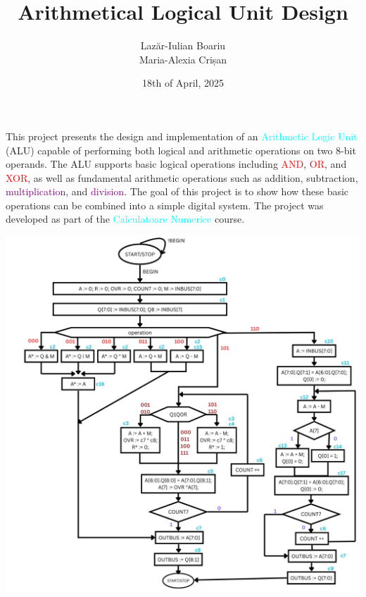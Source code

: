 \documentclass[12pt, letterpaper]{article}
\title{\color{BlueGreen}\textbf{Arithmetical Logical Unit Design}}
\author{
\textcolor{OliveGreen}{Laz\u{a}r-Iulian Boariu} \\
\textcolor{OliveGreen}{Maria-Alexia Crișan}
                                        }
\date{18th of April, 2025}
\begin{document}
\maketitle

\newpage

\tableofcontents

\newpage


This project presents the design and implementation of an \textcolor{cyan}{Arithmetic Logic Unit} (ALU)
capable of performing both logical and arithmetic operations on two 8-bit operands. The ALU supports basic logical operations including
\textcolor{red}{AND}, \textcolor{red}{OR}, and \textcolor{red}{XOR},
as well as fundamental arithmetic operations such as
\textcolor{BurntOrange}{addition}, \textcolor{BurntOrange}{subtraction}, \textcolor{purple}{multiplication}, and \textcolor{purple}{division}.
The goal of this project is to show how these basic operations can be combined into a simple digital system.
The project was developed as part of the \textcolor{cyan}{Calculatoare Numerice} course.


\begin{center}
\includegraphics[scale=0.3]{Documentation/FSM}
\end{center}
\end{document}
